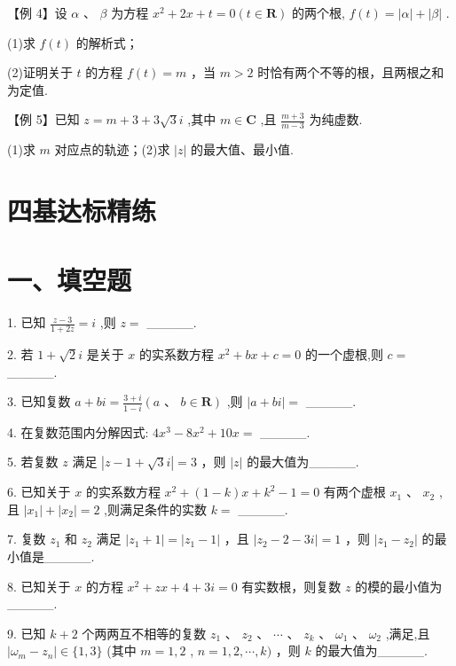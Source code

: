 【例 4】设 $\alpha \text{ 、 }\beta$ 为方程 ${x}^{2} + {2x} + t = 0\left( {t \in  \mathbf{R}}\right)$ 的两个根, $f\left( t\right)  = \left| \alpha \right|  + \left| \beta \right|$ .

(1)求 $f\left( t\right)$ 的解析式；

(2)证明关于 $t$ 的方程 $f\left( t\right)  = m$ ，当 $m > 2$ 时恰有两个不等的根，且两根之和为定值.

【例 5】已知 $z = m + 3 + 3\sqrt{3}{i}$ ,其中 $m \in  \mathbf{C}$ ,且 $\frac{m + 3}{m - 3}$ 为纯虚数.

(1)求 $m$ 对应点的轨迹；(2)求 $\left| z\right|$ 的最大值、最小值.

\section*{四基达标精练}

\section*{一、填空题}

1. 已知 $\frac{z - 3}{1 + {2z}} = {i}$ ,则 $z =$ \_\_\_\_\_.

2. 若 $1 + \sqrt{2}{i}$ 是关于 $x$ 的实系数方程 ${x}^{2} + {bx} + c = 0$ 的一个虚根,则 $c =$ \_\_\_\_\_.

3. 已知复数 $a + b{i} = \frac{3 + {i}}{1 - {i}}\left( {a\text{ 、 }b \in  \mathbf{R}}\right)$ ,则 $\left| {a + b{i}}\right|  =$ \_\_\_\_\_.

4. 在复数范围内分解因式: $4{x}^{3} - 8{x}^{2} + {10x} =$ \_\_\_\_\_.

5. 若复数 $z$ 满足 $\left| {z - 1 + \sqrt{3}{i}}\right|  = 3$ ，则 $\left| z\right|$ 的最大值为\_\_\_\_\_.

6. 已知关于 $x$ 的实系数方程 ${x}^{2} + \left( {1 - k}\right) x + {k}^{2} - 1 = 0$ 有两个虚根 ${x}_{1}\text{ 、 }{x}_{2}$ ,且 $\left| {x}_{1}\right|  + \left| {x}_{2}\right|  = 2$ ,则满足条件的实数 $k =$ \_\_\_\_\_.

7. 复数 ${z}_{1}$ 和 ${z}_{2}$ 满足 $\left| {{z}_{1} + 1}\right|  = \left| {{z}_{1} - 1}\right|$ ，且 $\left| {{z}_{2} - 2 - {3{i}}}\right|  = 1$ ，则 $\left| {{z}_{1} - {z}_{2}}\right|$ 的最小值是\_\_\_\_\_.

8. 已知关于 $x$ 的方程 ${x}^{2} + {zx} + 4 + {3{i}} = 0$ 有实数根，则复数 $z$ 的模的最小值为\_\_\_\_\_.

9. 已知 $k + 2$ 个两两互不相等的复数 ${z}_{1}\text{ 、 }{z}_{2}\text{ 、 }\cdots \text{ 、 }{z}_{k}\text{ 、 }{\omega }_{1}\text{ 、 }{\omega }_{2}$ ,满足,且 $\left| {{\omega }_{m} - {z}_{n}}\right|  \in  \{ 1,3\}$ (其中 $m = 1,2$ , $n = 1,2,\cdots ,k)$ ，则 $k$ 的最大值为\_\_\_\_\_.

